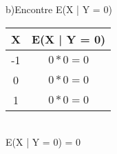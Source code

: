 \documentclass[12pt,a4paper]{article}
\begin{document}
\vspace{1cm}
b)Encontre E(X | Y = 0)
\vspace{1cm}\\
\begin{center}
	\begin{tabular}{c|c}
		X & E(X | Y = 0)\\ \hline
		-1 & $0 * 0 = 0$\\ \hline
		0 & $0 * 0 = 0$\\ \hline
		1 & $0 * 0 = 0$\\
	\end{tabular}
\vspace{1cm}\\
E(X | Y = 0) = 0
\end{center}
\end{document}
